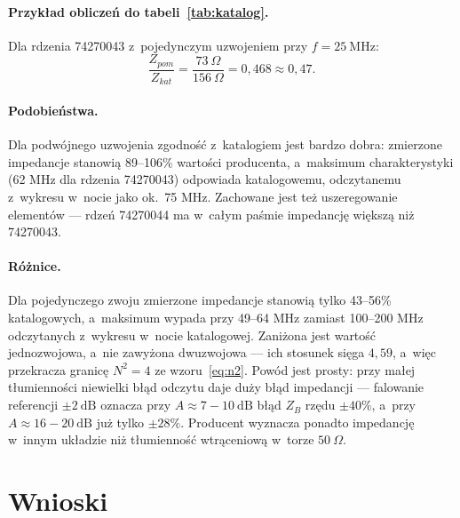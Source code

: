 \documentclass[11pt,a4paper]{article}
\begin{document}
\paragraph{Przykład obliczeń do tabeli~\ref{tab:katalog}.}
Dla rdzenia 74270043 z~pojedynczym uzwojeniem przy $f = 25\ \mathrm{MHz}$:
\[
\frac{Z_{pom}}{Z_{kat}} = \frac{73\ \Omega}{156\ \Omega} = 0{,}468 \approx 0{,}47 .
\]


\paragraph{Podobieństwa.} Dla podwójnego uzwojenia zgodność z~katalogiem jest bardzo
dobra: zmierzone impedancje stanowią 89--106\% wartości producenta, a~maksimum
charakterystyki (62 MHz dla rdzenia 74270043) odpowiada katalogowemu, odczytanemu
z~wykresu w~nocie jako ok.\ 75 MHz.
Zachowane jest też uszeregowanie elementów --- rdzeń 74270044 ma w~całym paśmie
impedancję większą niż 74270043.

\paragraph{Różnice.} Dla pojedynczego zwoju zmierzone impedancje stanowią tylko
43--56\% katalogowych, a~maksimum wypada przy 49--64 MHz zamiast 100--200 MHz
odczytanych z~wykresu w~nocie katalogowej.
Zaniżona jest wartość jednozwojowa, a~nie zawyżona dwuzwojowa --- ich stosunek sięga
$4{,}59$, a~więc przekracza granicę $N^2 = 4$ ze wzoru~\eqref{eq:n2}. Powód jest prosty:
przy małej tłumienności niewielki błąd odczytu daje duży błąd impedancji --- falowanie
referencji $\pm 2\ \mathrm{dB}$ oznacza przy $A \approx 7-10\ \mathrm{dB}$ błąd $Z_B$
rzędu $\pm 40\%$, a~przy $A \approx 16-20\ \mathrm{dB}$ już tylko $\pm 28\%$. Producent
wyznacza ponadto impedancję w~innym układzie niż tłumienność wtrąceniową w~torze
$50\ \Omega$.

\section{Wnioski}
\end{document}
